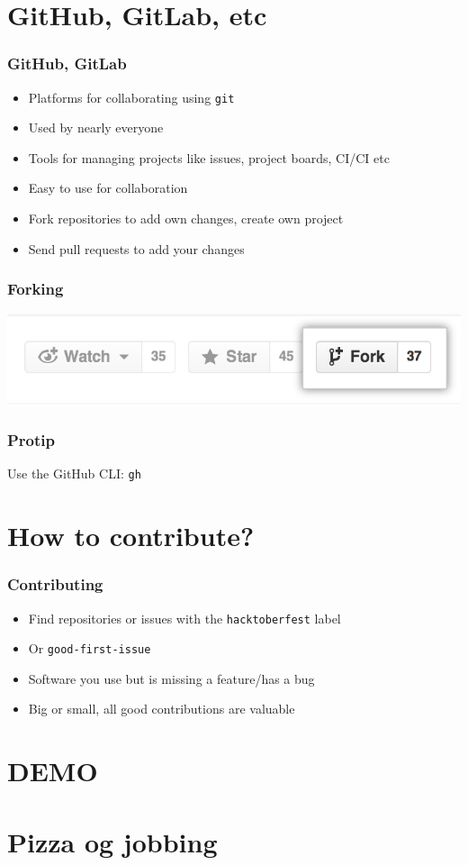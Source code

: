 \documentclass[presentation]{beamer}
\begin{document}
  \section{GitHub, GitLab, etc}
  \begin{frame}
    \frametitle{GitHub, GitLab}
  
    \begin{itemize}
      \item Platforms for collaborating using \texttt{git}
      \item Used by nearly everyone
      \item Tools for managing projects like issues, project boards, CI/CI etc
      \item Easy to use for collaboration
      \item Fork repositories to add own changes, create own project
      \item Send pull requests to add your changes
    \end{itemize}
  \end{frame}
  \begin{frame}
    \frametitle{Forking}
  
    \includegraphics[width=\textwidth]{forking.png}
  \end{frame}
  \begin{frame}[standout]
    \frametitle{Protip}
 
    Use the GitHub CLI: \texttt{gh}
  \end{frame}

  \section{How to contribute?}
  \begin{frame}
    \frametitle{Contributing}
  
    \begin{itemize}
      \item Find repositories or issues with the \texttt{hacktoberfest} label
      \item Or \texttt{good-first-issue}
      \item Software you use but is missing a feature/has a bug
      \item Big or small, all good contributions are valuable
    \end{itemize}
  \end{frame}

  \section{DEMO}
  \section*{Pizza og jobbing}
\end{document}
